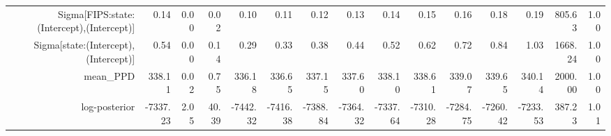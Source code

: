 \begin{table}[ht]
\begin{tabular}{rrrrrrrrrrrrrrr}
  Sigma[FIPS:state:(Intercept),(Intercept)] & 0.14 & 0.00 & 0.02 & 0.10 & 0.11 & 0.12 & 0.13 & 0.14 & 0.15 & 0.16 & 0.18 & 0.19 & 805.63 & 1.00 \\ 
  Sigma[state:(Intercept),(Intercept)] & 0.54 & 0.00 & 0.14 & 0.29 & 0.33 & 0.38 & 0.44 & 0.52 & 0.62 & 0.72 & 0.84 & 1.03 & 1668.24 & 1.00 \\ 
  mean\_PPD & 338.11 & 0.02 & 0.75 & 336.18 & 336.65 & 337.15 & 337.60 & 338.10 & 338.61 & 339.07 & 339.65 & 340.14 & 2000.00 & 1.00 \\ 
  log-posterior & -7337.23 & 2.05 & 40.39 & -7442.32 & -7416.38 & -7388.84 & -7364.32 & -7337.64 & -7310.28 & -7284.75 & -7260.42 & -7233.53 & 387.23 & 1.01 \\ 
   \hline
\end{tabular}
\end{table}
